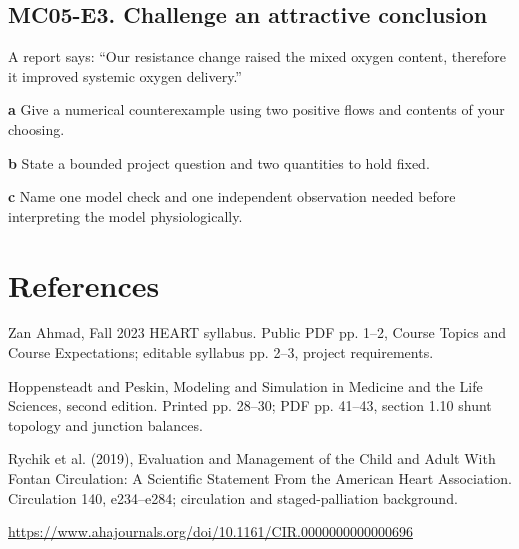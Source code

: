 \documentclass[11pt,letterpaper]{article}
\theoremstyle{definition}\newtheorem{definition}{Definition}\newtheorem{example}{Example}
\numberwithin{equation}{section}
\begin{document}
\par\noindent\begin{minipage}{\linewidth}
\subsection*{MC05-E3. Challenge an attractive conclusion}
A report says: ``Our resistance change raised the mixed oxygen content, therefore it improved systemic oxygen delivery.''

\textbf{a} Give a numerical counterexample using two positive flows and contents of your choosing.

\end{minipage}\par\medskip
\textbf{b} State a bounded project question and two quantities to hold fixed.

\textbf{c} Name one model check and one independent observation needed before interpreting the model physiologically.

\section*{References}
\noindent\begin{minipage}{\linewidth}
Zan Ahmad, Fall 2023 HEART syllabus. Public PDF pp. 1--2, Course Topics and Course Expectations; editable syllabus pp. 2--3, project requirements.

\end{minipage}\par\medskip
\noindent\begin{minipage}{\linewidth}
Hoppensteadt and Peskin, Modeling and Simulation in Medicine and the Life Sciences, second edition. Printed pp. 28--30; PDF pp. 41--43, section 1.10 shunt topology and junction balances.

\end{minipage}\par\medskip
\noindent\begin{minipage}{\linewidth}
Rychik et al. (2019), Evaluation and Management of the Child and Adult With Fontan Circulation: A Scientific Statement From the American Heart Association. Circulation 140, e234--e284; circulation and staged-palliation background.

\url{https://www.ahajournals.org/doi/10.1161/CIR.0000000000000696}
\end{minipage}\par\medskip
\end{document}
